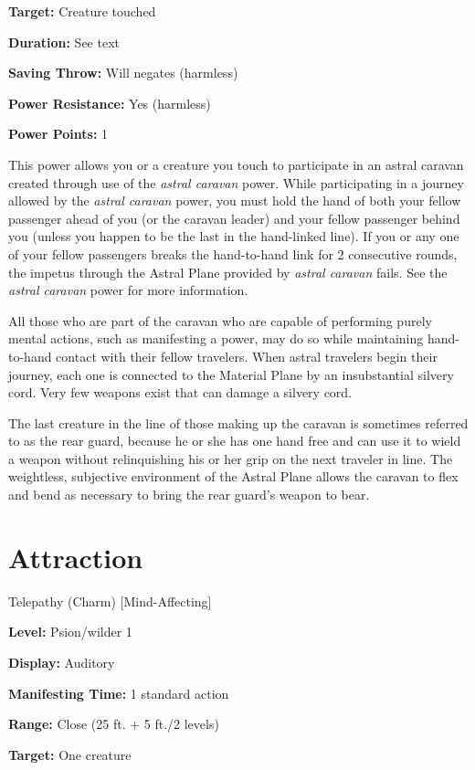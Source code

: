\documentclass{article}
\begin{document}
\textbf{Target:} Creature touched

\textbf{Duration:} See text

\textbf{Saving Throw:} Will negates (harmless)

\textbf{Power Resistance:} Yes (harmless)

\textbf{Power Points:} 1

This power allows you or a creature you touch to participate in an astral caravan 
created through use of the \textit{astral caravan }power. While participating in 
a journey allowed by the \textit{astral caravan }power, you must hold the hand 
of both your fellow passenger ahead of you (or the caravan leader) and your fellow 
passenger behind you (unless you happen to be the last in the hand-linked line). 
If you or any one of your fellow passengers breaks the hand-to-hand link for 2 
consecutive rounds, the impetus through the Astral Plane provided by \textit{astral 
caravan }fails. See the \textit{astral caravan }power for more information.

All those who are part of the caravan who are capable of performing purely mental 
actions, such as manifesting a power, may do so while maintaining hand-to-hand 
contact with their fellow travelers. When astral travelers begin their journey, 
each one is connected to the Material Plane by an insubstantial silvery cord. Very 
few weapons exist that can damage a silvery cord.

The last creature in the line of those making up the caravan is sometimes referred 
to as the rear guard, because he or she has one hand free and can use it to wield 
a weapon without relinquishing his or her grip on the next traveler in line. The 
weightless, subjective environment of the Astral Plane allows the caravan to flex 
and bend as necessary to bring the rear guard's weapon to bear.

\vspace{12pt}
\section*{Attraction}

Telepathy (Charm) [Mind-Affecting]

\textbf{Level:} Psion/wilder 1

\textbf{Display:} Auditory

\textbf{Manifesting Time:} 1 standard action

\textbf{Range:} Close (25 ft. + 5 ft./2 levels)

\textbf{Target:} One creature
\end{document}
